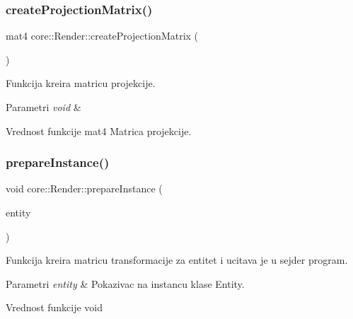 \subsubsection{\texorpdfstring{create\+Projection\+Matrix()}{createProjectionMatrix()}}
{\footnotesize\ttfamily mat4 core\+::\+Render\+::create\+Projection\+Matrix (\begin{DoxyParamCaption}{ }\end{DoxyParamCaption})\hspace{0.3cm}{\ttfamily [private]}}



Funkcija kreira matricu projekcije. 


\begin{DoxyParams}{Parametri}
{\em void} & \\
\hline
\end{DoxyParams}
\begin{DoxyReturn}{Vrednost funkcije}
mat4 Matrica projekcije. 
\end{DoxyReturn}
\mbox{\label{classcore_1_1Render_aeb298077579c71d8b4407dacbed75302}} 
\subsubsection{\texorpdfstring{prepare\+Instance()}{prepareInstance()}}
{\footnotesize\ttfamily void core\+::\+Render\+::prepare\+Instance (\begin{DoxyParamCaption}\item[{\hyperlink{classentity_1_1Entity}{Entity} $\ast$}]{entity }\end{DoxyParamCaption})}



Funkcija kreira matricu transformacije za entitet i ucitava je u sejder program. 


\begin{DoxyParams}{Parametri}
{\em entity} & Pokazivac na instancu klase Entity. \\
\hline
\end{DoxyParams}
\begin{DoxyReturn}{Vrednost funkcije}
void 
\end{DoxyReturn}
\mbox{\label{classcore_1_1Render_add7058167c0780784695497286c5e382}} 
